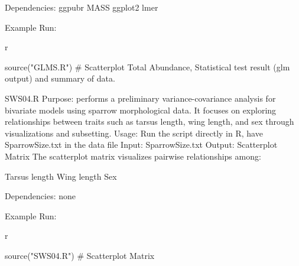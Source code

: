     Dependencies: 
    ggpubr
    MASS
    ggplot2
    lmer

    Example Run:

    r

    source("GLMS.R")
    #  Scatterplot Total Abundance, Statistical test result (glm output) and summary of data.
    
    
 
SWS04.R
    Purpose:  performs a preliminary variance-covariance analysis for bivariate models using sparrow        morphological data. It focuses on exploring relationships between traits such as tarsus length, wing length, and sex through visualizations and subsetting.
    Usage: Run the script directly in R, have SparrowSize.txt in the data file 
    Input: SparrowSize.txt
    Output: 
    Scatterplot Matrix
    The scatterplot matrix visualizes pairwise relationships among:

    Tarsus length
    Wing length
    Sex
     
    Dependencies: none

    Example Run:

    r

    source("SWS04.R")
    #  Scatterplot Matrix    
    
 














